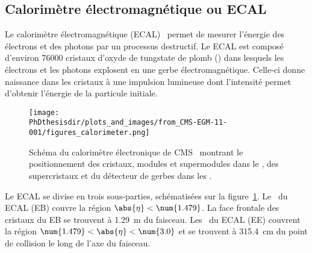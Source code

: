 \subsection{Calorimètre électromagnétique ou ECAL}\label{chapter-LHC-section-CMS-subsec-ECAL}
Le calorimètre électromagnétique (ECAL)~\cite{cms_paper,CERN-LHCC-97-033,CMS-EGM-11-001,CMS-DP-2019-005,CMS-DP-2020-021} permet de mesurer l'énergie des électrons et des photons par un processus destructif.
Le ECAL est composé d'environ \num{76000} cristaux d'oxyde de tungstate de plomb () dans lesquels les électrons et les photons explosent en une gerbe électromagnétique.
Celle-ci donne naissance dans les cristaux à une impulsion lumineuse dont l'intensité permet d'obtenir l'énergie de la particule initiale.
\begin{figure}[b]
\centering
\texttt{[image: \\PhDthesisdir/plots\_and\_images/from\_CMS-EGM-11-001/figures\_calorimeter.png]}
\caption[Schéma du calorimètre électronique de CMS.]{Schéma du calorimètre électronique de CMS~\cite{cms_paper,CMS-EGM-11-001} montrant le positionnement des cristaux, modules et supermodules dans le \CMSbarrel, des supercristaux et du détecteur de gerbes dans les \CMSendcaps.}
\label{fig-chapter-LHC-section-CMS-subsec-ECAL-CMS-EGM-11-001-figures_calorimeter}
\end{figure}
\par Le ECAL se divise en trois sous-parties, schématisées sur la figure~\ref{fig-chapter-LHC-section-CMS-subsec-ECAL-CMS-EGM-11-001-figures_calorimeter}.
Le \CMSbarrel\ du ECAL (EB) couvre la région $\abs{\eta}<\num{1.479}$.
La face frontale des cristaux du EB se trouvent à \SI{1.29}{\meter} du faisceau.
Les \CMSendcaps\ du ECAL (EE) couvrent la région $\num{1.479}<\abs{\eta}<\num{3.0}$ et se trouvent à \SI{315.4}{\centi\meter} du point de collision le long de l'axe du faisceau.
